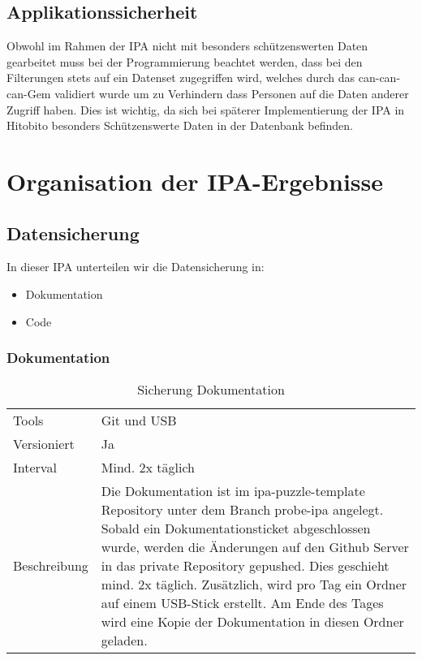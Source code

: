 \section{Applikationssicherheit}
Obwohl im Rahmen der IPA nicht mit besonders schützenswerten Daten gearbeitet muss bei der Programmierung beachtet werden,
dass bei den Filterungen stets auf ein Datenset zugegriffen wird, welches durch das can-can-can-Gem validiert wurde um zu
Verhindern dass Personen auf die Daten anderer Zugriff haben. Dies ist wichtig, da sich bei späterer Implementierung der IPA in 
Hitobito besonders Schützenswerte Daten in der Datenbank befinden.

\chapter{Organisation der IPA-Ergebnisse}

\section{Datensicherung}
In dieser IPA unterteilen wir die Datensicherung in:

\begin{itemize}
\item Dokumentation
\item Code
\end{itemize}

\subsection{Dokumentation}
\begin{table}[h!]
      \begin{tabular}{|L{0.4\textwidth}|L{0.5\textwidth}|}
          \hline
            \\[12pt]
          \hline
          Tools & Git und USB \\
          \hline
          Versioniert & Ja \\
          \hline
          Interval & Mind. 2x täglich \\
          \hline
          Beschreibung & Die Dokumentation ist im ipa-puzzle-template Repository unter dem Branch probe-ipa angelegt.
          Sobald ein Dokumentationsticket abgeschlossen wurde, werden die Änderungen auf den Github Server in das private Repository
          gepushed. Dies geschieht mind. 2x täglich. Zusätzlich, wird pro Tag ein Ordner auf einem USB-Stick erstellt.  Am Ende des Tages wird eine Kopie der Dokumentation
          in diesen Ordner geladen. \\
        \hline
        \end{tabular}
        \caption{Sicherung Dokumentation}
  \end{table}

